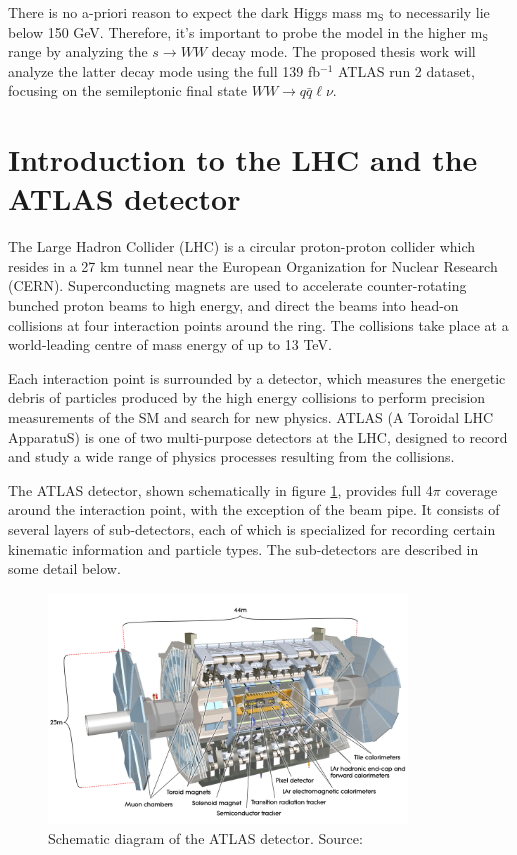 \documentclass[12pt]{article}
\begin{document}
There is no a-priori reason to expect the dark Higgs mass m$_\text{S}$ to necessarily lie below 150 GeV. Therefore, it's important to probe the model in the higher m$_\text{S}$ range by analyzing the $s \rightarrow WW$ decay mode. The proposed thesis work will analyze the latter decay mode using the full 139 fb$^{-1}$ ATLAS run 2 dataset, focusing on the semileptonic final state $WW \rightarrow q\bar{q}\ell\nu$.

\section{Introduction to the LHC and the ATLAS detector}

The Large Hadron Collider (LHC) \cite{lhc_machine} is a circular proton-proton collider which resides in a 27 km tunnel near the European Organization for Nuclear Research (CERN). Superconducting magnets are used to accelerate counter-rotating bunched proton beams to high energy, and direct the beams into head-on collisions at four interaction points around the ring. The collisions take place at a world-leading centre of mass energy of up to 13 TeV. 

Each interaction point is surrounded by a detector, which measures the energetic debris of particles produced by the high energy collisions to perform precision measurements of the SM and search for new physics. ATLAS (A Toroidal LHC ApparatuS) \cite{atlas} is one of two multi-purpose detectors at the LHC, designed to record and study a wide range of physics processes resulting from the collisions. 

The ATLAS detector, shown schematically in figure \ref{fig:detector}, provides full 4$\pi$ coverage around the interaction point, with the exception of the beam pipe. It consists of several layers of sub-detectors, each of which is specialized for recording certain kinematic information and particle types. The sub-detectors are described in some detail below. 

\begin{figure}[H]
	\centering
	\includegraphics[width=0.85\textwidth]{figures/detector.jpg}
	\caption[]{Schematic diagram of the ATLAS detector. Source: \cite{atlas}}
	\label{fig:detector}
\end{figure}
\end{document}
